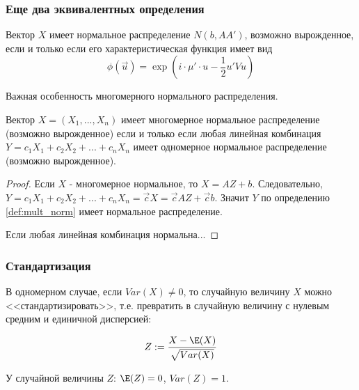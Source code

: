 \subsubsection*{Еще два эквивалентных определения}


\begin{myth}
Вектор $X$ имеет нормальное распределение $N(b,AA')$, возможно вырожденное, если и только если его характеристическая функция имеет вид 
\begin{equation}
\phi(\vec{u})=\exp\left(i\cdot \mu'\cdot u-\frac{1}{2}u'Vu \right)
\end{equation}

\end{myth}



Важная особенность многомерного нормального распределения.

\begin{myth} \label{th:normal_one2mult}
Вектор $X=(X_{1},...,X_{n})$ имеет многомерное нормальное распределение (возможно вырожденное) если и только если любая линейная комбинация $Y=c_{1}X_{1}+c_{2}X_{2}+...+c_{n}X_{n}$ имеет одномерное нормальное распределение (возможно вырожденное).
\end{myth}

\begin{proof}
Если $X$ - многомерное нормальное, то $X=AZ+b$. Следовательно, $Y=c_{1}X_{1}+c_{2}X_{2}+...+c_{n}X_{n}=\vec{c}X=\vec{c}AZ+\vec{c}b$. Значит $Y$ по определению \ref{def:mult_norm} имеет нормальное распределение.

Если любая линейная комбинация нормальна...

\end{proof}






\subsubsection*{Стандартизация}

В одномерном случае, если $Var(X)\neq 0$, то случайную величину $X$ можно <<стандартизировать>>, т.е. превратить в случайную величину с нулевым средним и единичной дисперсией: 

\begin{equation}
Z:=\frac{X-\E(X)}{\sqrt{Var(X)}}
\end{equation}

У случайной величины $Z$: $\E(Z)=0$, $Var(Z)=1$.

